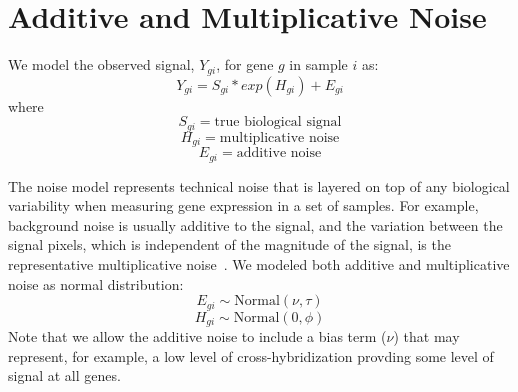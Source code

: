 \documentclass[11pt]{article}
\begin{document}
\section{Additive and Multiplicative Noise}

We model the observed signal, $Y_{gi}$, for gene $g$ in sample $i$ as: 
\[Y_{gi} = S_{gi} * exp(H_{gi}) + E_{gi}\]
where
\[S_{gi} = \mbox{true biological signal}\]
\[H_{gi} = \mbox{multiplicative noise}\]
\[E_{gi} = \mbox{additive noise}\]

The noise model represents technical noise that is layered on top of
any biological variability when measuring gene expression in a set of
samples.  For example, background noise is usually additive to the
signal, and the variation between the signal pixels, which is
independent of the magnitude of the signal, is the representative
multiplicative noise~\cite{pmid11595791}.  We modeled both additive
and multiplicative noise as normal distribution:
\[E_{gi} \sim \mbox{Normal}(\nu,\tau)\]
\[H_{gi} \sim \mbox{Normal}(0,\phi)\]
Note that we allow the additive noise to include a bias term ($\nu$)
that may represent, for example, a low level of cross-hybridization
provding some level of signal at all genes.
\end{document}

